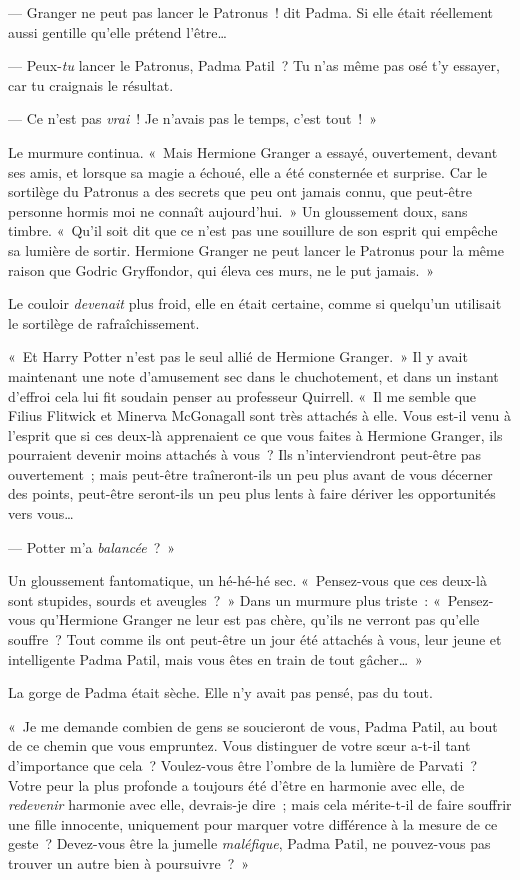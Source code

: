 --- Granger ne peut pas lancer le Patronus~! dit Padma.
Si elle était réellement aussi gentille qu'elle prétend l'être…

--- Peux-\emph{tu} lancer le Patronus, Padma Patil~?
Tu n'as même pas osé t'y essayer, car tu craignais le résultat.

--- Ce n'est pas \emph{vrai}~!
Je n'avais pas le temps, c'est tout~!~»

Le murmure continua.
«~Mais Hermione Granger a essayé, ouvertement, devant ses amis, et lorsque sa magie a échoué, elle a été consternée et surprise.
Car le sortilège du Patronus a des secrets que peu ont jamais connu, que peut-être personne hormis moi ne connaît aujourd'hui.~»
Un gloussement doux, sans timbre.
«~Qu'il soit dit que ce n'est pas une souillure de son esprit qui empêche sa lumière de sortir.
Hermione Granger ne peut lancer le Patronus pour la même raison que Godric Gryffondor, qui éleva ces murs, ne le put jamais.~»

Le couloir \emph{devenait} plus froid, elle en était certaine, comme si quelqu'un utilisait le sortilège de rafraîchissement.

«~Et Harry Potter n'est pas le seul allié de Hermione Granger.~»
Il y avait maintenant une note d'amusement sec dans le chuchotement, et dans un instant d'effroi cela lui fit soudain penser au professeur Quirrell.
«~Il me semble que Filius Flitwick et Minerva McGonagall sont très attachés à elle.
Vous est-il venu à l'esprit que si ces deux-là apprenaient ce que vous faites à Hermione Granger, ils pourraient devenir moins attachés à vous~?
Ils n'interviendront peut-être pas ouvertement~; mais peut-être traîneront-ils un peu plus avant de vous décerner des points, peut-être seront-ils un peu plus lents à faire dériver les opportunités vers vous…

--- Potter m'a \emph{balancée}~?~»

Un gloussement fantomatique, un hé-hé-hé sec.
«~Pensez-vous que ces deux-là sont stupides, sourds et aveugles~?~»
Dans un murmure plus triste~: «~Pensez-vous qu'Hermione Granger ne leur est pas chère, qu'ils ne verront pas qu'elle souffre~?
Tout comme ils ont peut-être un jour été attachés à vous, leur jeune et intelligente Padma Patil, mais vous êtes en train de tout gâcher…~»

La gorge de Padma était sèche.
Elle n'y avait pas pensé, pas du tout.

«~Je me demande combien de gens se soucieront de vous, Padma Patil, au bout de ce chemin que vous empruntez.
Vous distinguer de votre sœur a-t-il tant d'importance que cela~?
Voulez-vous être l'ombre de la lumière de Parvati~?
Votre peur la plus profonde a toujours été d'être en harmonie avec elle, de \emph{redevenir} harmonie avec elle, devrais-je dire~; mais cela mérite-t-il de faire souffrir une fille innocente, uniquement pour marquer votre différence à la mesure de ce geste~?
Devez-vous être la jumelle \emph{maléfique}, Padma Patil, ne pouvez-vous pas trouver un autre bien à poursuivre~?~»

